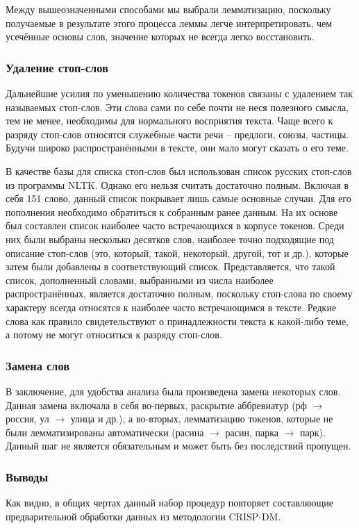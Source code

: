 Между вышеозначенными способами мы выбрали лемматизацию, поскольку получаемые в результате этого процесса леммы легче интерпретировать, чем усечённые основы слов, значение которых не всегда легко восстановить.

\subsubsection{Удаление стоп-слов}
Дальнейшие усилия по уменьшению количества токенов связаны с удалением так называемых стоп-слов. Эти слова сами по себе почти не неся полезного смысла, тем не менее, необходимы для нормального восприятия текста. Чаще всего к разряду стоп-слов относятся служебные части речи -- предлоги, союзы, частицы. Будучи широко распространёнными в тексте, они мало могут сказать о его теме.

В качестве базы для списка стоп-слов был использован список русских стоп-слов из программы NLTK. Однако его нельзя считать достаточно полным. Включая в себя 151 слово, данный список покрывает лишь самые основные случаи. Для его пополнения необходимо обратиться к собранным ранее данным. На их основе был составлен список наиболее часто встречающихся в корпусе токенов. Среди них были выбраны несколько десятков слов, наиболее точно подходящие под описание стоп-слов (это, который, такой, некоторый, другой, тот и др.), которые затем были добавлены в соответствующий список. Представляется, что такой список, дополненный словами, выбранными из числа наиболее распространённых, является достаточно полным, поскольку стоп-слова по своему характеру всегда относятся к наиболее часто встречающимся в тексте. Редкие слова как правило свидетельствуют о принадлежности текста к какой-либо теме, а потому не могут относиться к разряду стоп-слов.

\subsubsection{Замена слов}
В заключение, для удобства анализа была произведена замена некоторых слов. Данная замена включала в себя во-первых, раскрытие аббревиатур (рф $\to$ россия, ул $\to$ улица и др.), а во-вторых, лемматизацию токенов, которые не были лемматизированы автоматически (расина $\to$ расин, парка $\to$ парк). Данный шаг не является обязательным и может быть без последствий пропущен.

\subsubsection{Выводы}
Как видно, в общих чертах данный набор процедур повторяет составляющие предварительной обработки данных из методологии CRISP-DM.

